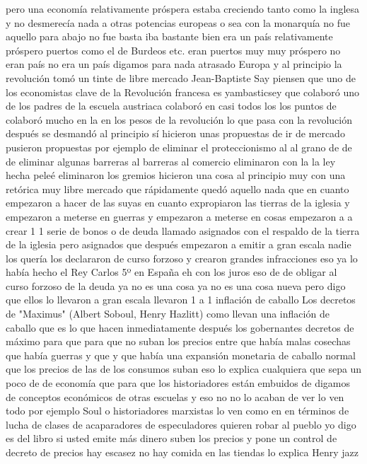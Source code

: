 pero una economía relativamente próspera estaba creciendo tanto como la inglesa y no desmerecía nada a otras potencias europeas
o sea con la monarquía no fue aquello para abajo no fue basta iba bastante bien
era un país relativamente próspero puertos como el de Burdeos etc. eran puertos muy muy próspero no eran país
no era un país digamos para nada atrasado Europa y al principio la revolución tomó un tinte de libre mercado
Jean-Baptiste Say
piensen que uno de los economistas clave de la Revolución francesa es yambasticsey que colaboró uno de los padres de la escuela austriaca
colaboró en casi todos los los puntos de colaboró mucho en la en los pesos de la revolución lo que pasa con la revolución después se desmandó
al principio sí hicieron unas propuestas de ir de mercado pusieron propuestas por ejemplo de eliminar
el proteccionismo al al grano de de de eliminar algunas barreras al barreras al comercio
eliminaron con la la ley hecha peleé eliminaron los gremios hicieron una cosa al principio muy con una retórica
muy libre mercado que rápidamente quedó aquello nada que en cuanto empezaron a hacer de las suyas en cuanto expropiaron las tierras de la iglesia
y empezaron a meterse en guerras y empezaron a meterse en cosas empezaron a a crear 1 1 serie de bonos o de deuda
llamado asignados con el respaldo de la tierra de la iglesia pero asignados que después
empezaron a emitir a gran escala nadie los quería los declararon de curso forzoso y crearon grandes infracciones
eso ya lo había hecho el Rey Carlos 5º en España eh con los juros eso de de obligar al curso forzoso de la deuda
ya no es una cosa ya no es una cosa nueva pero digo que ellos lo llevaron a gran escala llevaron 1 a 1 inflación de caballo
Los decretos de "Maximus" (Albert Soboul, Henry Hazlitt)
como llevan una inflación de caballo que es lo que hacen inmediatamente después los gobernantes decretos de máximo para que para que no suban los precios
entre que había malas cosechas que había guerras y que y que había una expansión monetaria de caballo normal que los precios de las de los consumos suban
eso lo explica cualquiera que sepa un poco de de economía que para que los historiadores están embuidos de digamos de conceptos económicos de otras escuelas
y eso no no lo acaban de ver lo ven todo por ejemplo Soul o historiadores marxistas lo ven como en en términos de lucha de clases
de acaparadores de especuladores quieren robar al pueblo yo digo es del libro si usted emite más dinero
suben los precios y pone un control de decreto de precios hay escasez no hay comida en las tiendas lo explica Henry jazz
